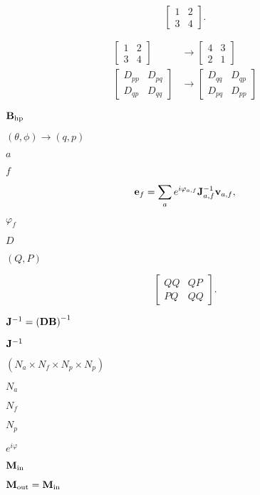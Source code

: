 \documentclass{article}
\begin{document}
\[ \begin{bmatrix} 1 & 2 \\ 3 & 4 \end{bmatrix}. \]
\pagebreak

\[ \begin{aligned} \begin{bmatrix} 1 & 2 \\ 3 & 4 \end{bmatrix} &\rightarrow \begin{bmatrix} 4 & 3 \\ 2 & 1 \end{bmatrix} \\ \begin{bmatrix} D_{pp} & D_{pq} \\ D_{qp} & D_{qq} \end{bmatrix} &\rightarrow \begin{bmatrix} D_{qq} & D_{qp} \\ D_{pq} & D_{pp} \end{bmatrix} \end{aligned} \]
\pagebreak

${\bf B}_\text{hp}$
\pagebreak

$(\theta,\phi)\rightarrow(q,p)$
\pagebreak

$a$
\pagebreak

$f$
\pagebreak

\[ {\bf e}_f = \sum_a e^{i\varphi_{a,f}} {\bf J}_{a,f}^{-1} {\bf v}_{a,f}, \]
\pagebreak

$\varphi_f$
\pagebreak

$D$
\pagebreak

$(Q,P)$
\pagebreak

\[\begin{bmatrix} QQ & QP \\ PQ & QQ \end{bmatrix}.\]
\pagebreak

${\bf J}^{-1} = \left({\bf D}{\bf B}\right)^{-1}$
\pagebreak

${\bf J}^{-1}$
\pagebreak

$(N_a \times N_f \times N_p \times N_p)$
\pagebreak

$N_a$
\pagebreak

$N_f$
\pagebreak

$N_p$
\pagebreak

$e^{i\varphi}$
\pagebreak

${\bf M}_\text{in}$
\pagebreak

${\bf M}_\text{out} = {\bf M}_\text{in}$
\pagebreak
\end{document}
